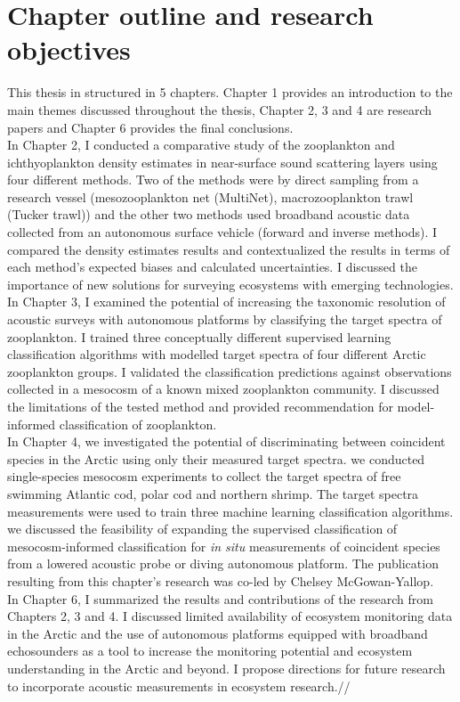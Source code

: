 \section{Chapter outline and research objectives}
This thesis in structured in 5 chapters. Chapter 1 provides an introduction to the main themes discussed throughout the thesis, Chapter 2, 3 and 4 are research papers and Chapter 6 provides the final conclusions.\\
In Chapter 2, I conducted a comparative study of the zooplankton and ichthyoplankton density estimates in near-surface sound scattering layers using four different methods. Two of the methods were by direct sampling from a research vessel (mesozooplankton net (MultiNet), macrozooplankton trawl (Tucker trawl)) and the other two methods used broadband acoustic data collected from an autonomous surface vehicle (forward and inverse methods). I compared the density estimates results and contextualized the results in terms of each method's expected biases and calculated uncertainties. I discussed the importance of new solutions for surveying ecosystems with emerging technologies.\\
In Chapter 3, I examined the potential of increasing the taxonomic resolution of acoustic surveys with autonomous platforms by classifying the target spectra of zooplankton. I trained three conceptually different supervised learning classification algorithms with modelled target spectra of four different Arctic zooplankton groups. I validated the classification predictions against observations collected in a mesocosm of a known mixed zooplankton community. I discussed the limitations of the tested method and provided recommendation for model-informed classification of zooplankton.\\
In Chapter 4, we investigated the potential of discriminating between coincident species in the Arctic using only their measured target spectra. we conducted single-species mesocosm experiments to collect the target spectra of free swimming Atlantic cod, polar cod and northern shrimp. The target spectra measurements were used to train three machine learning classification algorithms. we discussed the feasibility of expanding the supervised classification of mesocosm-informed classification for \textit{in situ} measurements of coincident species from a lowered acoustic probe or diving autonomous platform. The publication resulting from this chapter's research was co-led by Chelsey McGowan-Yallop.\\
In Chapter 6, I summarized the results and contributions of the research from Chapters 2, 3 and 4. I discussed limited availability of ecosystem monitoring data in the Arctic and the use of autonomous platforms equipped with broadband echosounders as a tool to increase the monitoring potential and ecosystem understanding in the Arctic and beyond. I propose directions for future research to incorporate acoustic measurements in ecosystem research.//
